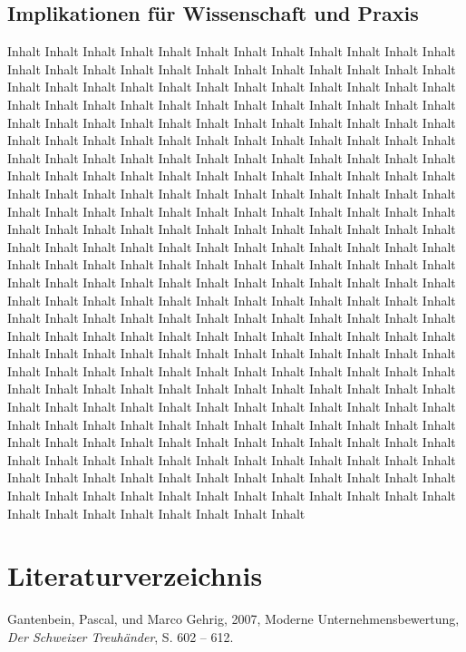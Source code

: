 \documentclass[11pt,a4paper,titlepage]{scrartcl}
\begin{document}
\subsection{Implikationen für Wissenschaft und Praxis}
Inhalt Inhalt Inhalt Inhalt Inhalt Inhalt Inhalt Inhalt Inhalt Inhalt Inhalt Inhalt Inhalt Inhalt Inhalt Inhalt Inhalt Inhalt Inhalt Inhalt Inhalt Inhalt Inhalt Inhalt Inhalt Inhalt Inhalt Inhalt Inhalt Inhalt Inhalt Inhalt Inhalt Inhalt Inhalt Inhalt Inhalt Inhalt Inhalt Inhalt Inhalt Inhalt Inhalt Inhalt Inhalt Inhalt Inhalt Inhalt Inhalt Inhalt Inhalt Inhalt Inhalt Inhalt Inhalt Inhalt Inhalt Inhalt Inhalt Inhalt Inhalt Inhalt Inhalt Inhalt Inhalt Inhalt Inhalt Inhalt Inhalt Inhalt Inhalt Inhalt Inhalt Inhalt Inhalt Inhalt Inhalt Inhalt Inhalt Inhalt Inhalt Inhalt Inhalt Inhalt Inhalt Inhalt Inhalt Inhalt Inhalt Inhalt Inhalt Inhalt Inhalt Inhalt Inhalt Inhalt Inhalt Inhalt Inhalt Inhalt Inhalt Inhalt Inhalt Inhalt Inhalt Inhalt Inhalt Inhalt Inhalt Inhalt Inhalt Inhalt Inhalt Inhalt Inhalt Inhalt Inhalt Inhalt Inhalt Inhalt Inhalt Inhalt Inhalt Inhalt Inhalt Inhalt Inhalt Inhalt Inhalt Inhalt Inhalt Inhalt Inhalt Inhalt Inhalt Inhalt Inhalt Inhalt Inhalt Inhalt Inhalt Inhalt Inhalt Inhalt Inhalt Inhalt Inhalt Inhalt Inhalt Inhalt Inhalt Inhalt Inhalt Inhalt Inhalt Inhalt Inhalt Inhalt Inhalt Inhalt Inhalt Inhalt Inhalt Inhalt Inhalt Inhalt Inhalt Inhalt Inhalt Inhalt Inhalt Inhalt Inhalt Inhalt Inhalt Inhalt Inhalt Inhalt Inhalt Inhalt Inhalt Inhalt Inhalt Inhalt Inhalt Inhalt Inhalt Inhalt Inhalt Inhalt Inhalt Inhalt Inhalt Inhalt Inhalt Inhalt Inhalt Inhalt Inhalt Inhalt Inhalt Inhalt Inhalt Inhalt Inhalt Inhalt Inhalt Inhalt Inhalt Inhalt Inhalt Inhalt Inhalt Inhalt Inhalt Inhalt Inhalt Inhalt Inhalt Inhalt Inhalt Inhalt Inhalt Inhalt Inhalt Inhalt Inhalt Inhalt Inhalt Inhalt Inhalt Inhalt Inhalt Inhalt Inhalt Inhalt Inhalt Inhalt Inhalt Inhalt Inhalt Inhalt Inhalt Inhalt Inhalt Inhalt Inhalt Inhalt Inhalt Inhalt Inhalt Inhalt Inhalt Inhalt Inhalt Inhalt Inhalt Inhalt Inhalt Inhalt Inhalt Inhalt Inhalt Inhalt Inhalt Inhalt Inhalt Inhalt Inhalt Inhalt Inhalt Inhalt Inhalt Inhalt Inhalt Inhalt Inhalt Inhalt Inhalt Inhalt Inhalt Inhalt Inhalt Inhalt Inhalt Inhalt Inhalt Inhalt Inhalt Inhalt Inhalt Inhalt Inhalt Inhalt Inhalt Inhalt Inhalt Inhalt Inhalt Inhalt Inhalt Inhalt Inhalt Inhalt Inhalt Inhalt Inhalt Inhalt Inhalt Inhalt Inhalt Inhalt Inhalt Inhalt Inhalt Inhalt Inhalt Inhalt Inhalt Inhalt 


\newpage
\section{Literaturverzeichnis}
Gantenbein, Pascal, und Marco Gehrig, 2007, Moderne Unternehmensbewertung, \textit{Der
Schweizer Treuhänder}, S. 602 – 612.
\end{document}
